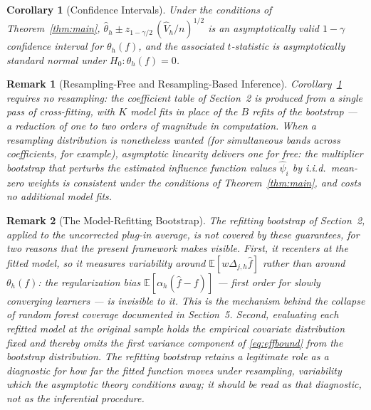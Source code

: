 \documentclass[12pt]{article}
\newtheorem{corollary}{Corollary}
\newtheorem{remark}{Remark}
\newcommand{\E}{\mathbb{E}}
\newcommand{\Dh}{\Delta_{j,h}}
\begin{document}
	\begin{corollary}[Confidence Intervals]
		\label{cor:ci}
		Under the conditions of Theorem~\ref{thm:main},
		$\hat{\theta}_h \pm z_{1-\gamma/2}\, (\hat{V}_h / n)^{1/2}$ is an
		asymptotically valid $1 - \gamma$ confidence interval for $\theta_h(f)$, and
		the associated $t$-statistic is asymptotically standard normal under
		$H_0 : \theta_h(f) = 0$.
	\end{corollary}
	
	\begin{remark}[Resampling-Free and Resampling-Based Inference]
		\label{rem:bootstrap}
		Corollary~\ref{cor:ci} requires no resampling: the coefficient table of
		Section~2 is produced from a single pass of cross-fitting, with $K$ model fits
		in place of the $B$ refits of the bootstrap --- a reduction of one to two orders
		of magnitude in computation. When a resampling distribution is nonetheless
		wanted (for simultaneous bands across coefficients, for example), asymptotic
		linearity delivers one for free: the multiplier bootstrap that perturbs the
		estimated influence function values $\hat{\psi}_i$ by i.i.d.\ mean-zero
		weights is consistent \citep[Chapter~3.6]{vandervaart1996weak} under the
		conditions of Theorem~\ref{thm:main}, and costs no additional model fits.
	\end{remark}
	
	\begin{remark}[The Model-Refitting Bootstrap]
		\label{rem:refit}
		The refitting bootstrap of Section~2, applied to the uncorrected plug-in
		average, is not covered by these guarantees, for two reasons that the present
		framework makes visible. First, it recenters at the fitted model, so it
		measures variability around $\E[w \Dh \hat{f}]$ rather than around
		$\theta_h(f)$: the regularization bias
		$\E[\alpha_h (\hat{f} - f)]$ --- first order for slowly converging learners
		--- is invisible to it. This is the mechanism behind the collapse of random
		forest coverage documented in Section~5. Second, evaluating each refitted model
		at the original sample holds the empirical covariate distribution fixed and
		thereby omits the first variance component of \eqref{eq:effbound} from the
		bootstrap distribution. The refitting bootstrap retains a legitimate role as a diagnostic for how far the fitted function moves under resampling, variability which the asymptotic theory conditions away; it should be read as that diagnostic,
		not as the inferential procedure.
	\end{remark}
	
\end{document}
